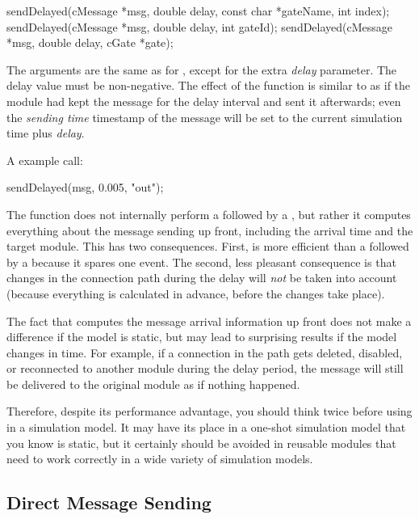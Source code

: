 \begin{cpp}
sendDelayed(cMessage *msg, double delay, const char *gateName, int index);
sendDelayed(cMessage *msg, double delay, int gateId);
sendDelayed(cMessage *msg, double delay, cGate *gate);
\end{cpp}

The arguments are the same as for , except for the extra
\textit{delay} parameter. The delay value must be non-negative.
The effect of the function is similar to as if the module
had kept the message for the delay interval and sent it afterwards;
even the \textit{sending time} timestamp of the message will be set to
the current simulation time plus \textit{delay}.

A example call:

\begin{cpp}
sendDelayed(msg, 0.005, "out");
\end{cpp}

The  function does not internally perform a
 followed by a , but rather it computes
everything about the message sending up front, including the arrival time
and the target module. This has two consequences. First,
 is more efficient than a 
followed by a  because it spares one event. The second, less
pleasant consequence is that changes in the connection path during the
delay will \textit{not} be taken into account (because everything is
calculated in advance, before the changes take place).

\begin{note}
  The fact that  computes the message arrival
  information up front does not make a difference if the model is static,
  but may lead to surprising results if the model changes in time.
  For example, if a connection in the path gets deleted, disabled, or
  reconnected to another module during the delay period, the message
  will still be delivered to the original module as if nothing happened.

  Therefore, despite its performance advantage, you should think twice
  before using  in a simulation model. It may have
  its place in a one-shot simulation model that you know is static,
  but it certainly should be avoided in reusable modules that need to
  work correctly in a wide variety of simulation models.
\end{note}


\subsection{Direct Message Sending}
\label{sec:simple-modules:direct-sending}


